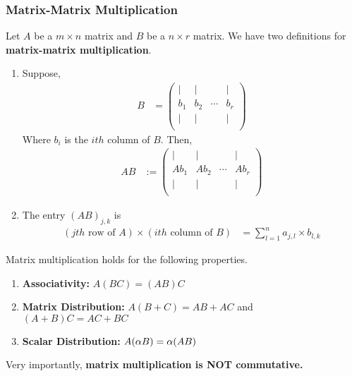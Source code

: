 \subsubsection{Matrix-Matrix Multiplication}
\begin{definition}
    Let $A$ be a $m \times n$ matrix and $B$ be a $n \times r$ matrix. We have two definitions for \textbf{matrix-matrix multiplication}.
    \begin{enumerate}
        \item Suppose,
        \begin{align*}
            B &= 
            \begin{pmatrix}
                | & | &  & | \\
                b_1 & b_2 & \cdots & b_r \\
                | & | &  & | \\
            \end{pmatrix}
        \end{align*}
        Where $b_i$ is the $ith$ column of $B$. Then,
        \begin{align*}
            AB &:= 
            \begin{pmatrix}
                | & | &  & | \\
                Ab_1 & Ab_2 & \cdots & Ab_r \\
                | & | &  & | \\
            \end{pmatrix}
        \end{align*}

        \item The entry $(AB)_{j,k}$ is
        \begin{align*}
            (jth \text{ row of $A$}) \times (ith \text{ column of $B$}) &= \sum_{l = 1}^{n} a_{j,l} \times b_{l,k}
        \end{align*}
    \end{enumerate}
\end{definition}

\begin{remark}
    Matrix multiplication holds for the following properties.
    \begin{enumerate}
        \item \textbf{Associativity:} $A(BC) = (AB)C$
        \item \textbf{Matrix Distribution:} $A(B + C) = AB + AC$ and $(A + B)C = AC + BC$
        \item \textbf{Scalar Distribution:} $A(\alpha B) = \alpha (AB)$
    \end{enumerate}

    Very importantly, \textbf{matrix multiplication is NOT commutative.}
\end{remark}

